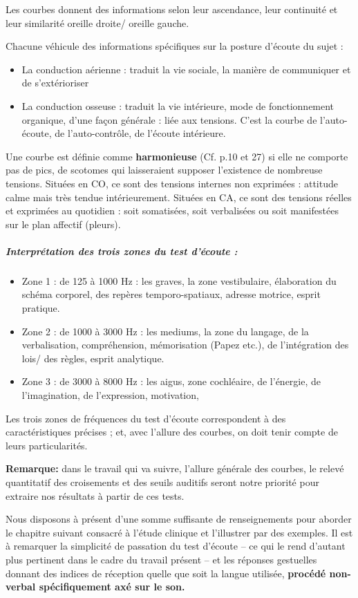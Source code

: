 Les courbes donnent des informations selon leur ascendance, leur
continuité et leur similarité oreille droite/ oreille gauche.

Chacune  véhicule des informations spécifiques
sur la posture d'écoute du sujet :
\begin{itemize}
\item La conduction aérienne : traduit la vie sociale, la manière de communiquer
et de s'extérioriser
\item La conduction osseuse : traduit la vie intérieure, mode de fonctionnement
organique, d'une façon générale : liée aux tensions. C'est la courbe
de l\textquoteright auto-écoute, de l\textquoteright auto-contrôle,
de l'écoute intérieure.
\end{itemize}

Une courbe est définie comme \textbf{harmonieuse} (Cf. p.10 et 27) si elle ne comporte pas de
pics, de scotomes
qui laisseraient
supposer l'existence de nombreuse tensions.
Situées en CO, ce sont des tensions internes non exprimées : attitude
calme mais très tendue intérieurement.
Situées en CA, ce sont des tensions réelles et exprimées au quotidien
: soit somatisées, soit verbalisées ou soit manifestées sur le plan
affectif (pleurs).

\subparagraph{Interprétation des trois zones du test d'écoute : }
\begin{itemize}
\item Zone 1 : de 125 à 1000 Hz : les graves, la zone vestibulaire, élaboration
du schéma corporel, des repères temporo-spatiaux, adresse motrice,
esprit pratique.
\item Zone 2 : de 1000 à 3000 Hz : les mediums, la zone du langage, de la
  verbalisation, compréhension,%
 mémorisation (Papez etc.), de l'intégration des lois/
 des règles, esprit analytique.
\item Zone 3 : de 3000 à 8000 Hz : les aigus, zone cochléaire, de l'énergie,
  de l'imagination, de l'expression, motivation,
\end{itemize}

Les trois zones de fréquences du test d'écoute correspondent à des
caractéristiques précises ; et, avec l'allure des courbes, on doit
tenir compte de leurs particularités.


\textbf{Remarque:} dans le travail qui va suivre, l'allure générale des courbes, le relevé quantitatif des
  croisements et des seuils auditifs seront notre priorité pour
  extraire nos résultats à partir de ces tests.

Nous disposons à présent d'une somme suffisante de renseignements pour
aborder le chapitre suivant consacré à l'étude clinique et
l'illustrer par des exemples.
Il est à remarquer la simplicité de
passation du test d'écoute -- ce qui le rend d'autant
plus pertinent dans le cadre du travail présent -- et les réponses gestuelles
 donnant des indices de réception %
quelle que soit la langue utilisée,\textbf{ procédé non-verbal
spécifiquement axé sur le son.}
